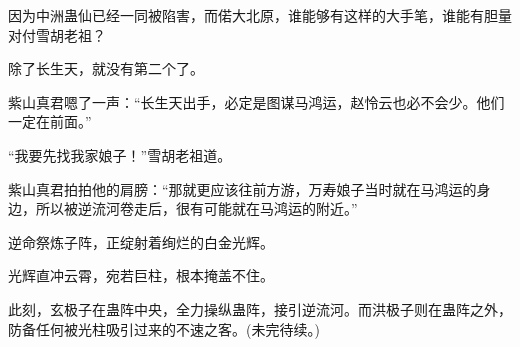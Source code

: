 \begin{this_body}
因为中洲蛊仙已经一同被陷害，而偌大北原，谁能够有这样的大手笔，谁能有胆量对付雪胡老祖？

除了长生天，就没有第二个了。

紫山真君嗯了一声：“长生天出手，必定是图谋马鸿运，赵怜云也必不会少。他们一定在前面。”

“我要先找我家娘子！”雪胡老祖道。

紫山真君拍拍他的肩膀：“那就更应该往前方游，万寿娘子当时就在马鸿运的身边，所以被逆流河卷走后，很有可能就在马鸿运的附近。”

逆命祭炼子阵，正绽射着绚烂的白金光辉。

光辉直冲云霄，宛若巨柱，根本掩盖不住。

此刻，玄极子在蛊阵中央，全力操纵蛊阵，接引逆流河。而洪极子则在蛊阵之外，防备任何被光柱吸引过来的不速之客。(未完待续。)

\end{this_body}

